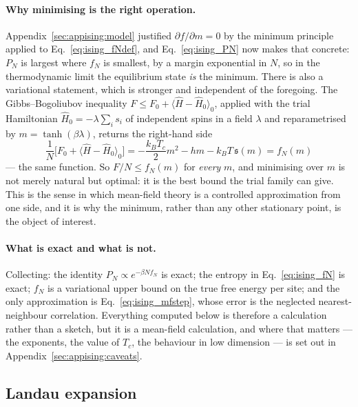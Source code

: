 \documentclass[10pt,a4paper]{article}
\theoremstyle{remark}
\begin{document}
\paragraph{Why minimising is the right operation.} Appendix~\ref{sec:appising:model}
justified $\partial f/\partial m=0$ by the minimum principle applied to
Eq.~\eqref{eq:ising_fNdef}, and Eq.~\eqref{eq:ising_PN} now makes that concrete:
$P_N$ is largest where $f_N$ is smallest, by a margin exponential in $N$, so in
the thermodynamic limit the equilibrium state \emph{is} the minimum. There is
also a variational statement, which is stronger and independent of the
foregoing. The Gibbs--Bogoliubov inequality $F\leq F_0+\langle\hat H-\hat
H_0\rangle_0$, applied with the trial Hamiltonian $\hat H_0=-\lambda\sum_is_i$ of
independent spins in a field $\lambda$ and reparametrised by
$m=\tanh(\beta\lambda)$, returns the right-hand side
\[
\frac{1}{N}\Big[F_0+\langle\hat H-\hat H_0\rangle_0\Big]
=-\frac{k_BT_c}{2}m^{2}-hm-k_BT\,\mathfrak{s}(m)
=f_N(m)
\]
--- the same function. So $F/N\leq f_N(m)$ for \emph{every} $m$, and minimising
over $m$ is not merely natural but optimal: it is the best bound the trial family
can give. This is the sense in which mean-field theory is a controlled
approximation from one side, and it is why the minimum, rather than any other
stationary point, is the object of interest.

\paragraph{What is exact and what is not.} Collecting: the identity
$P_N\propto e^{-\beta Nf_N}$ is exact; the entropy in Eq.~\eqref{eq:ising_fN} is
exact; $f_N$ is a variational upper bound on the true free energy per site; and
the only approximation is Eq.~\eqref{eq:ising_mfstep}, whose error is the
neglected nearest-neighbour correlation. Everything computed below is therefore a
calculation rather than a sketch, but it is a mean-field calculation, and where
that matters --- the exponents, the value of $T_c$, the behaviour in low
dimension --- is set out in Appendix~\ref{sec:appising:caveats}.

\subsection{Landau expansion}
\label{sec:appising:landau}
\end{document}
